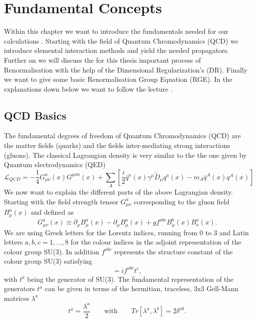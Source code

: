 \chapter{Fundamental Concepts}
Within this chapter we want to introduce the fundamentals needed for our calculations . Starting with the field of Quantum Chromodynamics (QCD) we introduce elemental interaction methods and yield the needed propagators. Further on we will discuss the for this thesis important process of Renormalisation with the help of the Dimensional Regularization's (DR). Finally we want to give some basic Renormalisation Group Equation (RGE). In the explanations down below we want to follow the lecture \cite{j06}.

\section{QCD Basics}
The fundamental degrees of freedom of Quantum Chromodynamics (QCD) are the matter fields (quarks) and the fields inter-mediating strong interactions (gluons). The classical Lagrangian density is very similar to the the one given by Quantum electrodynamics (QED)
\begin{equation}
	\label{eq:QCDLagrangianDensity}
	\mathcal{L}_{QCD} = -\frac{1}{4} G^a_{\mu\nu}(x) G^{\mu\nu a}(x) + \sum_A \left[ \frac{i}{2} \bar q^a(x) \gamma^\mu \overleftrightarrow{D}_\mu q^a(x) - m_A \bar q^A(x) q^A(x)\right]
\end{equation}
We now want to explain the different parts of the above Lagrangian density. Starting with the field strength tensor $G^a_{\mu\nu}$ corresponding to the gluon field $B^a_\mu(x)$ and defined as
\begin{equation}
	G^a_{\mu\nu}(x) \equiv \partial_\mu B^a_\mu(x) - \partial_\mu B^a_\mu (x) + gf^{abc} B^b_\mu(x) B^x_\nu(x).
\end{equation}
We are using Greek letters for the Lorentz indices, running from 0 to 3 and Latin letters $a,b,c = 1, \ldots, 8$ for the colour indices in the adjoint representation of the colour group SU(3). In addition $f^{abc}$ represents the structure constant of the colour group SU(3) satisfying 
\begin{equation}
	[t^a,t^b] = i f^{abc}t^c ,
\end{equation}
with $t^a$ being the generator of SU(3). The fundamental representation of the generators $t^a$ can be given in terms of the hermitian, traceless, 3x3 Gell-Mann matrices $\lambda^a$
\begin{equation}
	t^a = \frac{\lambda^a}{2} \qquad \text{with} \qquad Tr[\lambda^a, \lambda^b]= 2 \delta^{ab}.
\end{equation}
